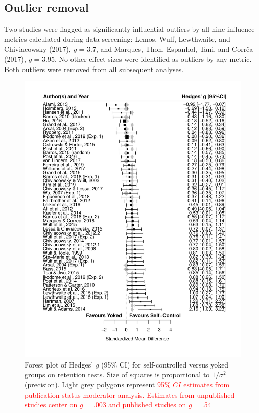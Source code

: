 \documentclass[
  english,
  man,floatsintext]{apa7}
\begin{document}
\hypertarget{outlier-removal}{%
\subsection{Outlier removal}\label{outlier-removal}}

Two studies were flagged as significantly influential outliers by all nine influence metrics calculated during data screening: Lemos, Wulf, Lewthwaite, and Chiviacowsky (2017), \emph{g} = 3.7, and Marques, Thon, Espanhol, Tani, and Corrêa (2017), \emph{g} = 3.95. No other effect sizes were identified as outliers by any metric. Both outliers were removed from all subsequent analyses.



\begin{figure}

{\centering \includegraphics[height=0.81\textheight]{../../figs/fig3} 

}

\caption{Forest plot of Hedges' \emph{g} (95\% CI) for self-controlled versus yoked groups on retention tests. Size of squares is proportional to \(1/\sigma^2\) (precision). Light grey polygons represent \textcolor{red}{95\% $CI$ estimates from publication-status moderator analysis. Estimates from unpublished studies center on $g$ = .003 and published studies on $g$ = .54}}\label{fig:fig3}
\end{figure}
\end{document}
